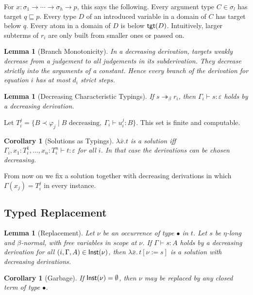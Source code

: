 \documentclass[10pt,a4paper]{article}
\theoremstyle{plain}%
\newtheorem{lemma}[theorem]{Lemma}
\newtheorem{corollary}[theorem]{Corollary}
\begin{document}
For $x : \sigma_1 \to \cdots \to \sigma_h \to p$, this says the following.
Every argument type $C \in \sigma_l$ has target $q \sqsubseteq p$.
Every type $D$ of an introduced variable in a domain of $C$ has target below $q$.
Every atom in a domain of $D$ is below $\mathsf{tgt}(D)$.
Intuitively, larger subterms of $r_i$ are only built from smaller ones or passed on.

\begin{lemma}[Branch Monotonicity]\label{lem:fifth-branch}
In a decreasing derivation, targets weakly decrease from a judgement to all judgements in its subderivation.
They decrease strictly into the arguments of a constant.
Hence every branch of the derivation for equation $i$ has at most $d_i$ strict steps.
\end{lemma}

\begin{lemma}[Decreasing Characteristic Typings]\label{lem:fifth-decr}
If $s \twoheadrightarrow_\beta r_i$, then $\Gamma_i \vdash s : \varepsilon$ holds by a decreasing derivation.
\end{lemma}

Let $T_i^j = \{B \prec \varphi_j \mid B \text{ decreasing},\ \Gamma_i \vdash u_i^j : B\}$.
This set is finite and computable.

\begin{corollary}[Solutions as Typings]\label{cor:fifth-sol}
$\lambda \bar x.t$ is a solution iff $\Gamma_i, x_1 : T_i^1, \ldots, x_n : T_i^n \vdash t : \varepsilon$ for all $i$.
In that case the derivations can be chosen decreasing.
\end{corollary}

From now on we fix a solution together with decreasing derivations in which $\Gamma(x_j) = T_i^j$ in every instance.

\subsection{Typed Replacement}

\begin{lemma}[Replacement]\label{lem:fifth-repl}
Let $\nu$ be an occurrence of type $\bullet$ in $t$.
Let $s$ be $\eta$-long and $\beta$-normal, with free variables in scope at $\nu$.
If $\Gamma \vdash s : A$ holds by a decreasing derivation for all $(i,\Gamma,A) \in \mathsf{Inst}(\nu)$, then $\lambda \bar x.\,t[\nu := s]$ is a solution with decreasing derivations.
\end{lemma}

\begin{corollary}[Garbage]\label{cor:fifth-garbage}
If $\mathsf{Inst}(\nu) = \emptyset$, then $\nu$ may be replaced by any closed term of type $\bullet$.
\end{corollary}
\end{document}

